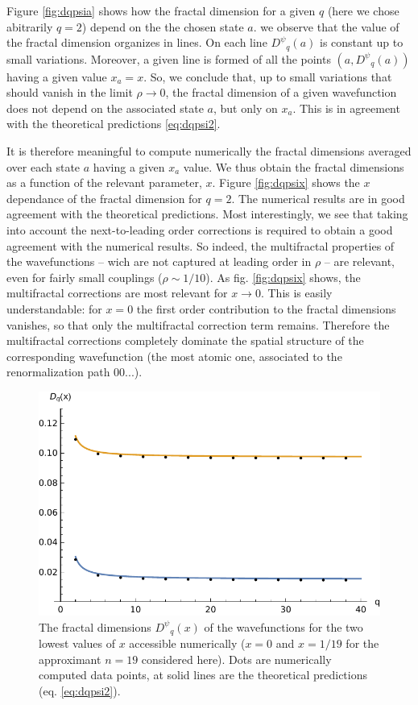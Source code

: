 \documentclass[aps,prl,preprint]{revtex4-1}
\newcommand{\wf}{\ensuremath{D^\psi}}
\begin{document}
Figure \eqref{fig:dqpsia} shows how the fractal dimension for a given $q$ (here we chose abitrarily $q=2$) depend on the the chosen state $a$.
we observe that the value of the fractal dimension organizes in lines. On each line $\wf_q(a)$ is constant up to small variations. Moreover, a given line is formed of all the points $(a, \wf_q(a))$ having a given value $x_a = x$. 
So, we conclude that, up to small variations that should vanish in the limit $\rho \rightarrow 0$, the fractal dimension of a given wavefunction does not depend on the associated state $a$, but only on $x_a$. This is in agreement with the theoretical predictions \eqref{eq:dqpsi2}.

It is therefore meaningful to compute numerically the fractal dimensions averaged over each state $a$ having a given $x_a$ value. We thus obtain the fractal dimensions as a function of the relevant parameter, $x$.
Figure \eqref{fig:dqpsix} shows the $x$ dependance of the fractal dimension for $q=2$. 
The numerical results are in good agreement with the theoretical predictions.
Most interestingly, we see that taking into account the next-to-leading order corrections is required to obtain a good agreement with the numerical results.
So indeed, the multifractal properties of the wavefunctions -- wich are not captured at leading order in $\rho$ -- are relevant, even for fairly small couplings ($\rho \sim 1/10$).
As fig. \eqref{fig:dqpsix} shows, the multifractal corrections are most relevant for $x \rightarrow 0$.
This is easily understandable: for $x=0$ the first order contribution to the fractal dimensions vanishes, so that only the multifractal correction term remains. 
Therefore the multifractal corrections completely dominate the spatial structure of the corresponding wavefunction (the most atomic one, associated to the renormalization path $00...$).

\begin{figure}[htp]
  \centering
  \includegraphics[width=.5\textwidth]{img/local_wf_q.pdf}
  \caption{The fractal dimensions $\wf_q(x)$ of the wavefunctions for the two lowest values of $x$ accessible numerically ($x = 0$ and $x = 1/19$ for the approximant $n=19$ considered here). Dots are numerically computed data points, at solid lines are the theoretical predictions (eq. \eqref{eq:dqpsi2}).}
\label{fig:dqpsiq}
\end{figure}
\end{document}
